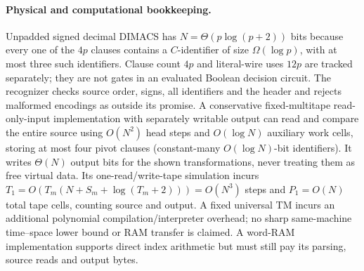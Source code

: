 \documentclass[11pt]{article}
\begin{document}
\paragraph{Physical and computational bookkeeping.}
Unpadded signed decimal DIMACS has $N=\Theta(p\log(p+2))$ bits because every one of the $4p$ clauses contains a $C$-identifier of size $\Omega(\log p)$, with at most three such identifiers. Clause count $4p$ and literal-wire uses $12p$ are tracked separately; they are not gates in an evaluated Boolean decision circuit. The recognizer checks source order, signs, all identifiers and the header and rejects malformed encodings as outside its promise. A conservative fixed-multitape read-only-input implementation with separately writable output can read and compare the entire source using $O(N^2)$ head steps and $O(\log N)$ auxiliary work cells, storing at most four pivot clauses (constant-many $O(\log N)$-bit identifiers). It writes $\Theta(N)$ output bits for the shown transformations, never treating them as free virtual data. Its one-read/write-tape simulation incurs $T_1=O(T_m(N+S_m+\log(T_m+2)))=O(N^3)$ steps and $P_1=O(N)$ total tape cells, counting source and output. A fixed universal TM incurs an additional polynomial compilation/interpreter overhead; no sharp same-machine time--space lower bound or RAM transfer is claimed. A word-RAM implementation supports direct index arithmetic but must still pay its parsing, source reads and output bytes.
\end{document}
